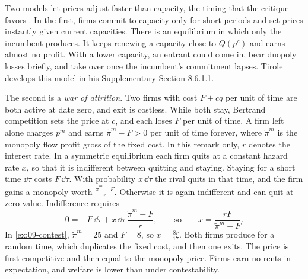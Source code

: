 \begin{remark}\label{rem:09-other-nm}
Two models let prices adjust faster than capacity, the timing that the critique favors
\citep[secs.~8.1.2--8.1.3 and 8.6.1]{Tirole1988}. In the first, firms commit to capacity only for short periods
and set prices instantly given current capacities. There is an equilibrium in which only the incumbent
produces. It keeps renewing a capacity close to $Q(p^c)$ and earns almost no profit. With a lower capacity, an
entrant could come in, bear duopoly losses briefly, and take over once the incumbent's commitment lapses.
Tirole develops this model in his Supplementary Section 8.6.1.1.

The second is a \emph{war of attrition}. Two firms with cost $F + cq$ per unit of time are both active at
date zero, and exit is costless. While both stay, Bertrand competition sets the price at $c$, and each loses
$F$ per unit of time. A firm left alone charges $p^m$ and earns $\tilde\pi^m - F > 0$ per unit of time forever,
where $\tilde\pi^m$ is the monopoly flow profit gross of the fixed cost. In this remark only, $r$ denotes the
interest rate. In a symmetric equilibrium each firm quits at a constant hazard rate $x$, so that it is
indifferent between quitting and staying. Staying for a short time $\dd\tau$ costs $F\,\dd\tau$. With
probability $x\,\dd\tau$ the rival quits in that time, and the firm gains a monopoly worth
$\frac{\tilde\pi^m - F}{r}$. Otherwise it is again indifferent and can quit at zero value. Indifference requires
\begin{equation*}
  0 = -F\,\dd\tau + x\,\dd\tau\,\frac{\tilde\pi^m - F}{r},
  \qquad\text{so}\qquad
  x = \frac{rF}{\tilde\pi^m - F}.
\end{equation*}
In \cref{ex:09-contest}, $\tilde\pi^m = 25$ and $F = 8$, so $x = \frac{8r}{17}$. Both firms produce for a random
time, which duplicates the fixed cost, and then one exits. The price is first competitive and then equal to
the monopoly price. Firms earn no rents in expectation, and welfare is lower than under contestability.
\end{remark}

